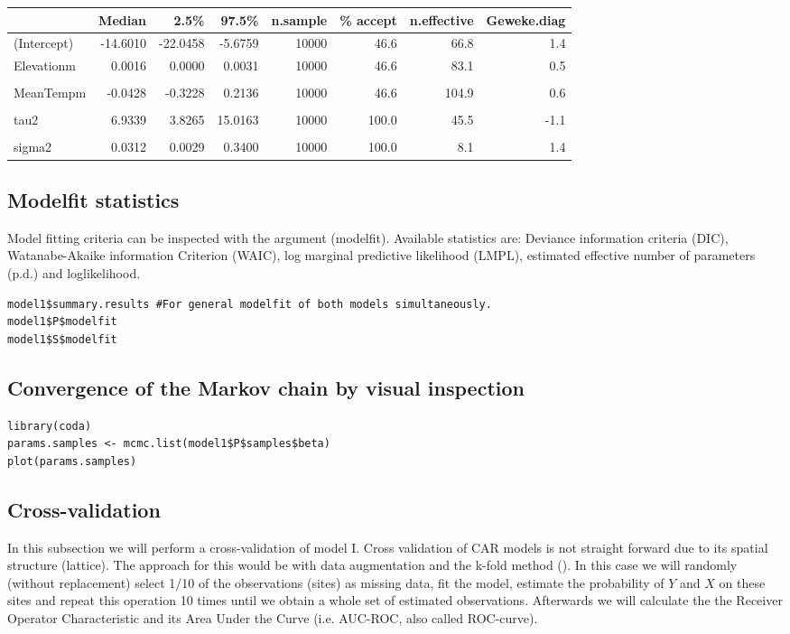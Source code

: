 \documentclass[11pt]{article}
\begin{document}
\begin{center}
\begin{tabular}{lrrrrrrr}
 & Median & 2.5\% & 97.5\% & n.sample & \% accept & n.effective & Geweke.diag\\
\hline
(Intercept) & -14.6010 & -22.0458 & -5.6759 & 10000 & 46.6 & 66.8 & 1.4\\
Elevationm & 0.0016 & 0.0000 & 0.0031 & 10000 & 46.6 & 83.1 & 0.5\\
 &  &  &  &  &  &  & \\
MeanTempm & -0.0428 & -0.3228 & 0.2136 & 10000 & 46.6 & 104.9 & 0.6\\
 &  &  &  &  &  &  & \\
tau2 & 6.9339 & 3.8265 & 15.0163 & 10000 & 100.0 & 45.5 & -1.1\\
 &  &  &  &  &  &  & \\
sigma2 & 0.0312 & 0.0029 & 0.3400 & 10000 & 100.0 & 8.1 & 1.4\\
\end{tabular}
\end{center}

\subsection{Modelfit statistics}
\label{sec:orgc5644bf}
Model fitting criteria can be inspected with the argument (modelfit). Available statistics are:
Deviance information criteria (DIC), Watanabe-Akaike information Criterion (WAIC), log marginal predictive likelihood (LMPL), estimated effective number of parameters (p.d.) and  loglikelihood.

\begin{verbatim}
model1$summary.results #For general modelfit of both models simultaneously.
model1$P$modelfit
model1$S$modelfit
\end{verbatim}

\subsection{Convergence of the Markov chain by visual inspection}
\label{sec:org3d84e50}
\begin{verbatim}
library(coda)
params.samples <- mcmc.list(model1$P$samples$beta)
plot(params.samples)
\end{verbatim}

\subsection{Cross-validation}
\label{sec:org0418cfe}
In this subsection we will perform a cross-validation of model I. Cross validation of CAR models is not straight forward due to its spatial structure (lattice). The approach for this would be with data augmentation and the k-fold method (\cite{Geisser1975}). In this case we will randomly (without replacement) select 1/10 of the observations (sites) as missing data, fit the model, estimate the probability of \(Y\) and \(X\) on these sites and repeat this operation 10 times until we obtain a whole set of estimated observations. Afterwards we will calculate the the Receiver Operator Characteristic and its Area Under the Curve (i.e. AUC-ROC, also called ROC-curve).
\end{document}
